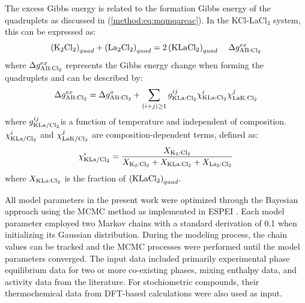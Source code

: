 The excess Gibbs energy is related to the formation Gibbs energy of the quadruplets as discussed in (\ref{method:eq:mqmqareac}). In the KCl-LaCl$_3$ system, this can be expressed as:
\begin{equation} \label{ms:eq:lamqmreac}
    \left(\rm K_2{\rm Cl}_2\right)_{quad}+\left({\rm La}_2{\rm Cl}_2\right)_{quad}=2\left(\rm KLa{\rm Cl}_2\right)_{quad}\;\;\;\;\Delta g_{\rm AB:Cl_2}^{ex}
\end{equation}
where $\Delta g_{\rm AB:Cl_2}^{ex}$ represents the Gibbs energy change when forming the quadruplets and can be described by: 
\begin{equation} \label{ms:eq:lamqmgex}
    \Delta g_{\rm AB:Cl_2}^{ex}=\Delta g_{\rm AB:Cl_2}^{o}+\sum_{(i+j)\geq1}{g_{\rm KLa:{\rm Cl}_2}^{ij}\chi_{\rm KLa:{\rm Cl}_2}^i\chi_{\rm LaK:{\rm Cl}_2}^j}
\end{equation}
where $g_{\rm KLa/{\rm Cl}_2}^{ij}$is a function of temperature and independent of composition. $\chi_{\rm KLa/{\rm Cl}_2}^i$ and $\chi_{\rm LaK/{\rm Cl}_2}^j$ are composition-dependent terms, defined as:
\begin{equation} \label{ms:eq:lamqmchi}
    \chi_{\rm KLa/{\rm Cl}_2}^i=\frac{X_{\rm K_2:Cl_2}}{X_{\rm K_2:Cl_2}+X_{\rm KLa:Cl_2}+X_{{\rm La}_2:{\rm Cl}_2}}
\end{equation}
where $X_{\rm KLa:Cl_2}$ is the fraction of $\left(\rm KLaCl_2\right)_{quad}$. 

All model parameters in the present work were optimized through the Bayesian approach using the MCMC method as implemented in ESPEI \cite{bocklund2019espei}. Each model parameter employed two Markov chains with a standard derivation of 0.1 when initializing its Gaussian distribution. During the modeling process, the chain values can be tracked and the MCMC processes were performed until the model parameters converged. The input data included primarily experimental phase equilibrium data for two or more co-existing phases, mixing enthalpy data, and activity data from the literature. For stochiometric compounds, their thermochemical data from DFT-based calculations were also used as input. 

